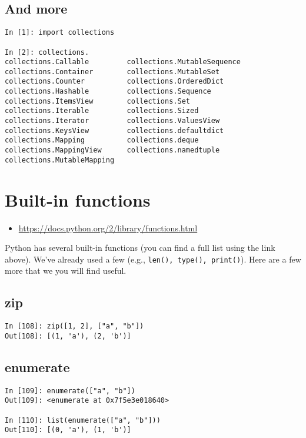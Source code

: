 \subsection{And more}

\begin{verbatim}
In [1]: import collections

In [2]: collections.
collections.Callable         collections.MutableSequence
collections.Container        collections.MutableSet
collections.Counter          collections.OrderedDict
collections.Hashable         collections.Sequence
collections.ItemsView        collections.Set
collections.Iterable         collections.Sized
collections.Iterator         collections.ValuesView
collections.KeysView         collections.defaultdict
collections.Mapping          collections.deque
collections.MappingView      collections.namedtuple
collections.MutableMapping   
\end{verbatim}

\section{Built-in functions}
\begin{itemize}
\item \url{https://docs.python.org/2/library/functions.html}
\end{itemize}

Python has several built-in functions (you can find a full list using the link
above).  We've already used a few (e.g., \texttt{len(), type(), print()}).
Here are a few more that we you will find useful.

\subsection{zip}
\begin{verbatim}
In [108]: zip([1, 2], ["a", "b"])
Out[108]: [(1, 'a'), (2, 'b')]
\end{verbatim}

\subsection{enumerate}
\begin{verbatim}
In [109]: enumerate(["a", "b"])
Out[109]: <enumerate at 0x7f5e3e018640>

In [110]: list(enumerate(["a", "b"]))
Out[110]: [(0, 'a'), (1, 'b')]
\end{verbatim}

